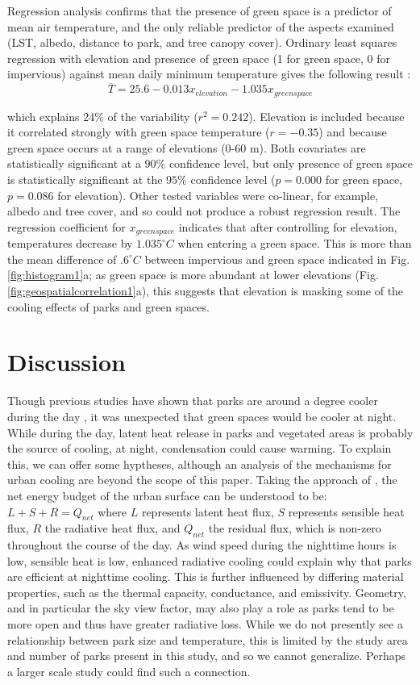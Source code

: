 Regression analysis confirms that the presence of green space is a predictor of mean air temperature, and the only reliable predictor of the aspects examined (LST, albedo, distance to park, and tree canopy cover). Ordinary least squares regression with elevation and presence of green space (1 for green space, 0 for impervious) against mean daily minimum temperature gives the following result :
\[  \overline{T} = 25.6 - 0.013 x_{elevation} -1.035 x_{greenspace} \]

which explains 24\% of the variability ($r^2=0.242$). 
Elevation is included because it correlated strongly with green space temperature ($r=-0.35$) and because green space occurs at a range of elevations (0-60 m). Both covariates are statistically significant at a 
$ 90\% $
confidence level, but only presence of green space is statistically significant at the 
$ 95\% $ 
confidence level ($p = 0.000$ for green space, $p=0.086$ for elevation). Other tested variables were co-linear, for example, albedo and tree cover, and so could not produce a robust regression result. The regression coefficient for $x_{greenspace} $ indicates that after controlling for elevation, temperatures decrease by $1.035^{\circ} C$ when entering a green space. This is more than the mean difference of $.6^{\circ} C$ between impervious and green space indicated in Fig. \ref{fig:histogram1}a; as green space is more abundant at lower elevations (Fig. \ref{fig:geospatialcorrelation1}a), this suggests that elevation is masking some of the cooling effects of parks and green spaces. 

\section{Discussion}
Though previous studies have shown that parks are around a degree cooler during the day \citep{urbangreeningreview}, it was unexpected that green spaces would be cooler at night. While during the day, latent heat release in parks and vegetated areas is probably the source of cooling, at night, condensation could cause warming. To explain this, we can offer some hyptheses, although an analysis of the mechanisms for urban cooling are beyond the scope of this paper. 
Taking the approach of \cite{oke1991}, the net energy budget of the urban surface can be understood to be: $L+S+R = Q_{net}$  where $L$ represents latent heat flux, $S$ represents sensible heat flux, $R$ the radiative heat flux, and $Q_{net}$ the residual flux, which is non-zero throughout the course of the day. As wind speed during the nighttime hours is low, sensible heat is low, enhanced radiative cooling could explain why that parks are efficient at nighttime cooling. This is further influenced by differing material properties, such as the thermal capacity, conductance, and emissivity. Geometry, and in particular the sky view factor, may also play a role as parks tend to be more open and thus have greater radiative loss.  
While we do not presently see a relationship between park size and temperature, this is limited by the study area and number of parks present in this study, and so we cannot generalize. Perhaps a larger scale study could find such a connection. 

